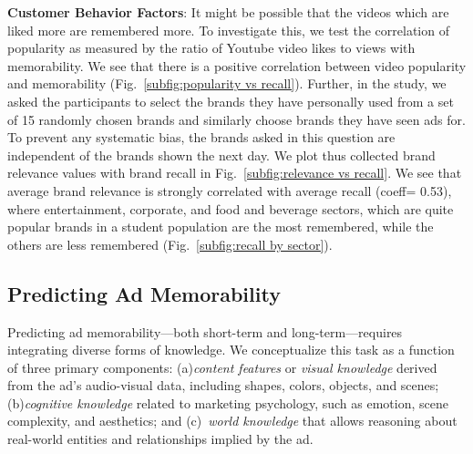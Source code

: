 

\textbf{Customer Behavior Factors}: It might be possible that the videos which are liked more are remembered more. To investigate this, we test the correlation of popularity as measured by the ratio of Youtube video likes to views with memorability. We see that there is a positive correlation between video popularity and memorability (Fig.~\ref{subfig:popularity vs recall}). Further, in the study, we asked the participants to select the brands they have personally used from a set of 15 randomly chosen brands and similarly choose brands they have seen ads for. To prevent any systematic bias, the brands asked in this question are independent of the brands shown the next day. We plot thus collected brand relevance values with brand recall in Fig.~\ref{subfig:relevance vs recall}. We see that average brand relevance is strongly correlated with average recall (coeff= 0.53), where entertainment, corporate, and food and beverage sectors, which are quite popular brands in a student population are the most remembered, while the others are less remembered (Fig.~\ref{subfig:recall by sector}).



\subsection{Predicting Ad Memorability}
\label{sec:Predicting Ad Memorability}

Predicting ad memorability—both short-term and long-term—requires integrating diverse forms of knowledge. We conceptualize this task as a function of three primary components: (a)\textit{content features} or \textit{visual knowledge} derived from the ad's audio-visual data, including shapes, colors, objects, and scenes; (b)\textit{cognitive knowledge} related to marketing psychology, such as emotion, scene complexity, and aesthetics; and (c)~\textit{world knowledge} that allows reasoning about real-world entities and relationships implied by the ad.

